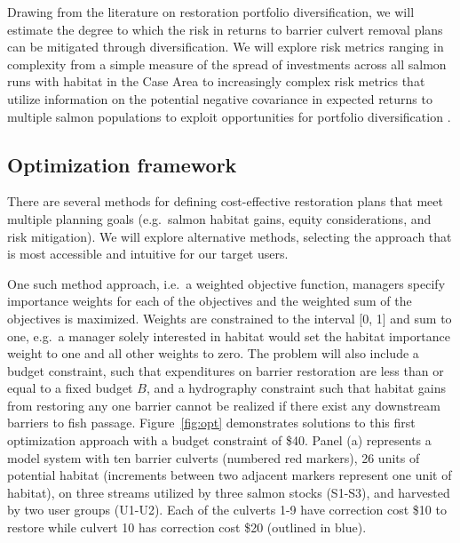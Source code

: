 \documentclass[12pt]{elsarticle}
\begin{document}
Drawing from the literature on restoration portfolio diversification, we will estimate the degree to which the risk in returns to barrier culvert removal plans can be mitigated through diversification. We will explore risk metrics ranging in complexity from a simple measure of the spread of investments across all salmon runs with habitat in the Case Area to increasingly complex risk metrics that utilize information on the potential negative covariance in expected returns to multiple salmon populations to exploit opportunities for portfolio diversification \citep{sanchirico_empirical_2008, jardine_fishermen_2015, johnston_combining_2002}.  

\subsection*{Optimization framework \label{sec:opt}}

There are several methods for defining cost-effective restoration plans that meet multiple planning goals (e.g.\ salmon habitat gains, equity considerations, and risk mitigation). We will explore alternative methods, selecting the approach that is most accessible and intuitive for our target users. 

One such method approach, i.e.\ a weighted objective function, managers specify importance weights for each of the objectives and the weighted sum of the objectives is maximized. Weights are constrained to the interval [0, 1] and sum to one, e.g.\ a manager solely interested in habitat would set the habitat importance weight to one and all other weights to zero. The problem will also include a budget constraint, such that expenditures on barrier restoration are less than or equal to a fixed budget $B$, and a hydrography constraint such that habitat gains from restoring any one barrier cannot be realized if there exist any downstream barriers to fish passage. Figure~\ref{fig:opt} demonstrates solutions to this first optimization approach with a budget constraint of \$40. Panel (a) represents a model system with ten barrier culverts (numbered red markers), 26 units of potential habitat (increments between two adjacent markers represent one unit of habitat), on three streams utilized by three salmon stocks (S1-S3), and harvested by two user groups (U1-U2). Each of the culverts 1-9 have correction cost \$10 to restore while culvert 10 has correction cost \$20 (outlined in blue).
\end{document}
